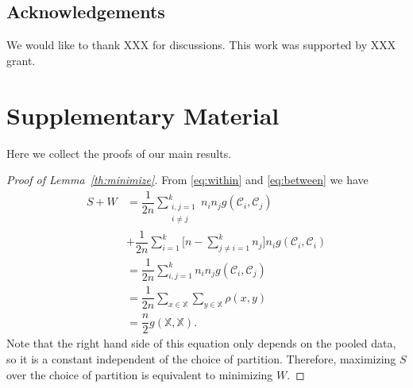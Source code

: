 \documentclass[twoside]{article}
\newcommand\C{{\mathcal{C}}}
\begin{document}
\subsection*{Acknowledgements}
We would like to thank XXX
for discussions.
This work was supported by 
XXX
grant.


%
%



\clearpage

\appendix

\section{Supplementary Material}

Here we collect the proofs of our main results.

\begin{proof}[Proof of Lemma~\ref{th:minimize}]
From \eqref{eq:within} and \eqref{eq:between}
we have
\begin{equation}
\begin{split}
S + W &= 
\dfrac{1}{2n} \sum_{\substack{i,j=1 \\ i\ne j}}^k n_i n_j g(\C_i, \C_j)
\\&+ \dfrac{1}{2n} \sum_{i=1}^{k} 
\bigg[ n - 
\sum_{j\ne i = 1}^k n_j \bigg] 
n_i g(\C_i, \C_i) \\
& = \dfrac{1}{2n} \sum_{i,j=1}^k n_i n_j g(\C_i, \C_j) \\
&= \dfrac{1}{2n} \sum_{x \in \mathbb{X}} \sum_{y \in \mathbb{X}} \rho(x,y)\\
&= \dfrac{n}{2} g(\mathbb{X}, \mathbb{X}).
\end{split}
\end{equation}
Note that the right hand side of this equation 
only depends on the pooled data, so it is a constant
independent of the choice of partition. Therefore, maximizing
$S$ over the choice of partition is equivalent to minimizing $W$.
\end{proof}
\end{document}
